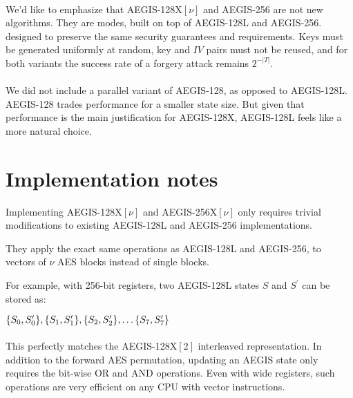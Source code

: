 \documentclass[envcountsame,runningheads,notitlepage]{llncs}
\begin{document}
\paragraph{}

We'd like to emphasize that AEGIS-128X$[\nu]$ and AEGIS-256 are not new algorithms. They are modes, built on top of AEGIS-128L and AEGIS-256. designed to preserve the same security guarantees and requirements.
Keys must be generated uniformly at random, key and $IV$ pairs must not be reused, and for both variants the success rate of a forgery attack remains $2^{-\lvert T \rvert}$.

\paragraph{}

We did not include a parallel variant of AEGIS-128, as opposed to AEGIS-128L. AEGIS-128 trades performance for a smaller state size. But given that performance is the main justification for AEGIS-128X, AEGIS-128L feels like a more natural choice.

\section{Implementation notes}
\label{sec:implementation notes}

Implementing AEGIS-128X$[\nu]$ and AEGIS-256X$[\nu]$ only requires trivial modifications to existing AEGIS-128L and AEGIS-256 implementations.

They apply the exact same operations as AEGIS-128L and AEGIS-256, to vectors of $\nu$ AES blocks instead of single blocks.

For example, with 256-bit registers, two AEGIS-128L states $S$ and $S^{\prime}$ can be stored as:

\begin{math}
  \\
  \{ S_0, S^{\prime}_0 \}, \{ S_1, S^{\prime}_1 \}, \{ S_2, S^{\prime}_2 \}, \ldots \{ S_7, S^{\prime}_7 \}
\end{math}

\paragraph{}

This perfectly matches the AEGIS-128X$[2]$ interleaved representation. In addition to the forward AES permutation, updating an AEGIS state only requires the bit-wise OR and AND operations. Even with wide registers, such operations are very efficient on any CPU with vector instructions.
\end{document}
